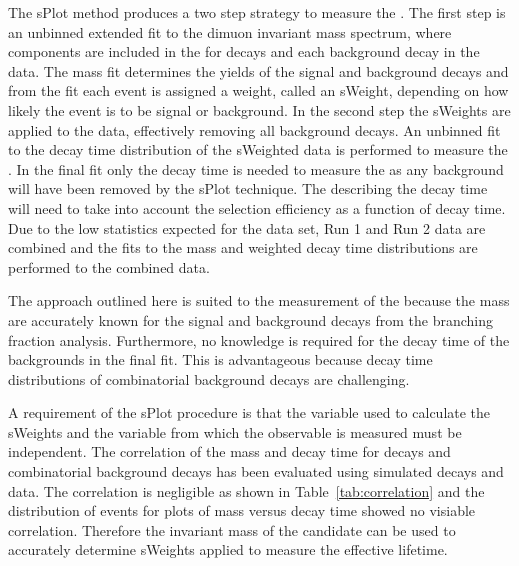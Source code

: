 The sPlot method produces a two step strategy to measure the \el. The first step is an unbinned extended \ml fit to the dimuon invariant mass spectrum, where components are included in the \pdf for \bsmumu decays and each background decay in the data. The mass fit determines the yields of the signal and background decays and from the fit each event is assigned a weight, called an sWeight, depending on how likely the event is to be signal or background. In the second step the sWeights are applied to the data, effectively removing all background decays. An unbinned \ml fit to the decay time distribution of the sWeighted data is performed to measure the \bsmumu \el. In the final fit only the \bsmumu decay time \pdf is needed to measure the \el as any background will have been removed by the sPlot technique. The \pdf describing the decay time will need to take into account the selection efficiency as a function of decay time. Due to the low statistics expected for the data set, Run 1 and Run 2 data are combined and the fits to the mass and weighted decay time distributions are performed to the combined data.


The approach outlined here is suited to the measurement of the \bsmumu \el because the mass \pdfs are accurately known for the signal and background decays from the branching fraction analysis. Furthermore, no knowledge is required for the decay time \pdfs of the backgrounds in the final fit. This is advantageous because decay time distributions of combinatorial background decays are challenging.


A requirement of the sPlot procedure is that the variable used to calculate the sWeights and the variable from which the observable is measured must be independent. The correlation of the mass and decay time for \bsmumu decays and combinatorial background decays has been evaluated using simulated decays and data. The correlation is negligible %
as shown in Table~\ref{tab:correlation} and the distribution of events for plots of mass versus decay time showed no visiable correlation. Therefore the invariant mass of the \bsmumu candidate can be used to accurately determine sWeights applied  to measure the \bsmumu effective lifetime.

